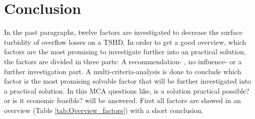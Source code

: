 \newpage
\section{Conclusion}


In the past paragraphs, twelve factors are investigated to decrease the surface turbidity of overflow losses on a TSHD. In order to get a good overview, which factors are the most promising to investigate further into an practical solution, the factors are divided in three parts: A recommendation- , no influence- or a further investigation part. A multi-criteria-analysis is done to conclude which factor is the most promising solvable factor that will be further investigated into a practical solution. In this MCA questions like, is a solution practical possible? or is it economic feasible? will be answered. First all factors are showed in an overview (Table \ref{tab:Overview_factors}) with a short conclusion. \newline 

